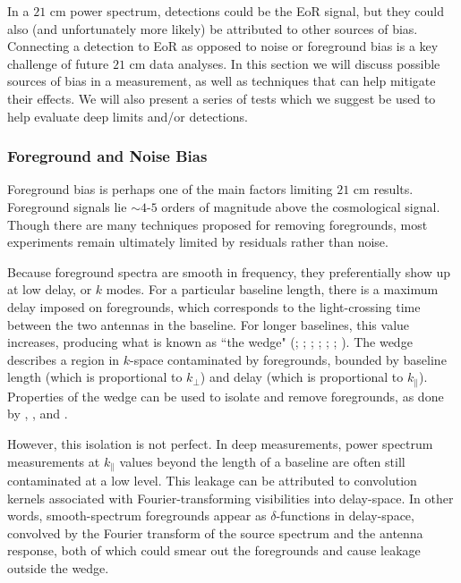 \documentclass[preprint2,numberedappendix,tighten]{aastex6}  %
\begin{document}
In a $21$ cm power spectrum, detections could be the EoR signal, but they could also (and unfortunately more likely) be attributed to other sources of bias. Connecting a detection to EoR as opposed to noise or foreground bias is a key challenge of future $21$ cm data analyses. In this section we will discuss possible sources of bias in a measurement, as well as techniques that can help mitigate their effects. We will also present a series of tests which we suggest be used to help evaluate deep limits and/or detections.

\subsubsection{Foreground and Noise Bias}
\label{sec:BiasTypes}

Foreground bias is perhaps one of the main factors limiting $21$ cm results. Foreground signals lie $\sim4$-$5$ orders of magnitude above the cosmological signal. Though there are many techniques proposed for removing foregrounds, most experiments remain ultimately limited by residuals rather than noise.

Because foreground spectra are smooth in frequency, they preferentially show up at low delay, or $k$ modes. For a particular baseline length, there is a maximum delay imposed on foregrounds, which corresponds to the light-crossing time between the two antennas in the baseline. For longer baselines, this value increases, producing what is known as ``the wedge" (\citealt{parsons_et_al2012b}; \citealt{liu_et_al2014a}; \citealt{liu_et_al2014b}; \citealt{vedantham_et_al2012}; \citealt{thyagarajan_et_al2013}; \citealt{pober_et_al2013}; \citealt{datta_et_al2010}). The wedge describes a region in $k$-space contaminated by foregrounds, bounded by baseline length (which is proportional to $k_{\perp}$) and delay (which is proportional to $k_{\parallel}$). Properties of the wedge can be used to isolate and remove foregrounds, as done by \citet{ali_et_al2015}, \citet{parsons_et_al2014}, and \citet{jacobs_et_al2015}.

However, this isolation is not perfect.  In deep measurements, power spectrum measurements at $k_{\parallel}$ values beyond the length of a baseline are often still contaminated at a low level. This leakage can be attributed to convolution kernels associated with Fourier-transforming visibilities into delay-space. In other words, smooth-spectrum foregrounds appear as $\delta$-functions in delay-space, convolved by the Fourier transform of the source spectrum and the antenna response, both of which could smear out the foregrounds and cause leakage outside the wedge.
\end{document}
